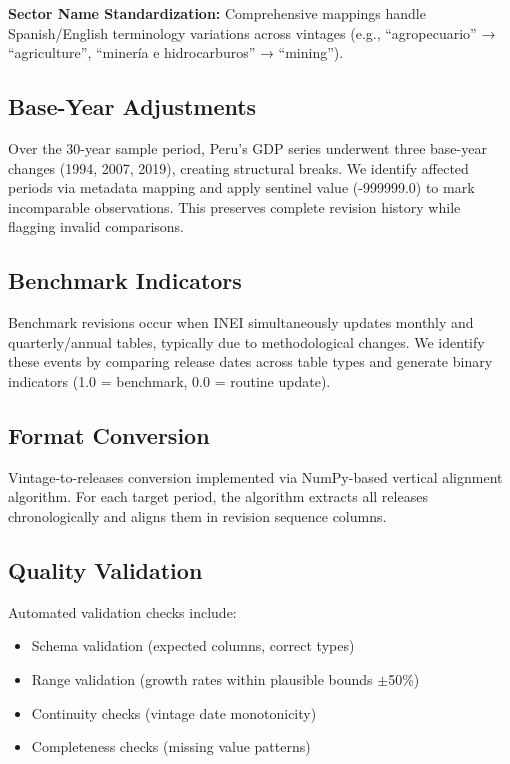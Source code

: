 \documentclass[12pt]{article}
\begin{document}
\textbf{Sector Name Standardization:} Comprehensive mappings handle Spanish/English terminology variations across vintages (e.g., ``agropecuario'' → ``agriculture'', ``minería e hidrocarburos'' → ``mining'').

\subsection*{Base-Year Adjustments}

Over the 30-year sample period, Peru's GDP series underwent three base-year changes (1994, 2007, 2019), creating structural breaks. We identify affected periods via metadata mapping and apply sentinel value (-999999.0) to mark incomparable observations. This preserves complete revision history while flagging invalid comparisons.

\subsection*{Benchmark Indicators}

Benchmark revisions occur when INEI simultaneously updates monthly and quarterly/annual tables, typically due to methodological changes. We identify these events by comparing release dates across table types and generate binary indicators (1.0 = benchmark, 0.0 = routine update).

\subsection*{Format Conversion}

Vintage-to-releases conversion implemented via NumPy-based vertical alignment algorithm. For each target period, the algorithm extracts all releases chronologically and aligns them in revision sequence columns.

\subsection*{Quality Validation}

Automated validation checks include:
\begin{itemize}
\item Schema validation (expected columns, correct types)
\item Range validation (growth rates within plausible bounds $\pm$50\%)
\item Continuity checks (vintage date monotonicity)
\item Completeness checks (missing value patterns)
\end{itemize}
\end{document}
